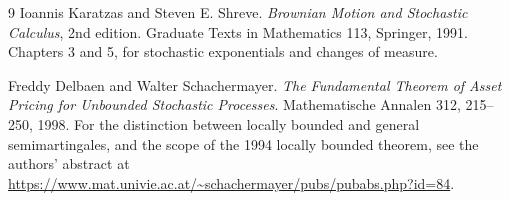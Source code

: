 \documentclass[11pt,letterpaper]{report}
\begin{document}
\begin{thebibliography}{9}
Ioannis Karatzas and Steven E. Shreve.
\emph{Brownian Motion and Stochastic Calculus}, 2nd edition.
Graduate Texts in Mathematics 113, Springer, 1991.
Chapters 3 and 5, for stochastic exponentials and changes of measure.

Freddy Delbaen and Walter Schachermayer.
\emph{The Fundamental Theorem of Asset Pricing for Unbounded Stochastic
Processes}. Mathematische Annalen 312, 215--250, 1998.
For the distinction between locally bounded and general semimartingales,
and the scope of the 1994 locally bounded theorem, see the authors'
abstract at
\url{https://www.mat.univie.ac.at/~schachermayer/pubs/pubabs.php?id=84}.
\end{thebibliography}
\end{document}
